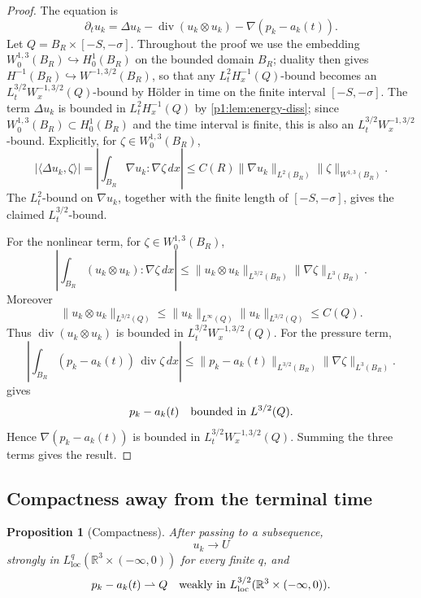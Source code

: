 \documentclass[11pt]{amsart}
\theoremstyle{plain}
\newtheorem{proposition}[proposition]{Proposition}
\theoremstyle{definition}
\theoremstyle{remark}
\numberwithin{equation}{section}
\newcommand{\R}{\mathbb R}
\newcommand{\loc}{\mathrm{loc}}
\newcommand{\divergence}{\operatorname{div}}
\begin{document}
\begin{proof}
The equation is
\[
   \partial_tu_k
   =
   \Delta u_k-\divergence(u_k\otimes u_k)-\nabla(p_k-a_k(t)).
\]
Let \(Q=B_R\times[-S,-\sigma]\).  Throughout the proof we use the
embedding \(W^{1,3}_0(B_R)\hookrightarrow H^1_0(B_R)\) on the bounded
domain \(B_R\); duality then gives
\(H^{-1}(B_R)\hookrightarrow W^{-1,3/2}(B_R)\), so that any
\(L^2_tH^{-1}_x(Q)\)-bound becomes an \(L^{3/2}_tW^{-1,3/2}_x(Q)\)-bound
by H\"older in time on the finite interval \([-S,-\sigma]\).  The term
\(\Delta u_k\) is bounded in
\(L^2_tH^{-1}_x(Q)\) by \cref{p1:lem:energy-diss}; since
\(W^{1,3}_0(B_R)\subset H^1_0(B_R)\) and the time interval is finite, this is
also an \(L^{3/2}_tW^{-1,3/2}_x\)-bound.  Explicitly, for
\(\zeta\in W^{1,3}_0(B_R)\),
\[
   |\langle\Delta u_k,\zeta\rangle|
   =
   \left|\int_{B_R}\nabla u_k:\nabla\zeta\,dx\right|
   \le
   C(R)\|\nabla u_k\|_{L^2(B_R)}\|\zeta\|_{W^{1,3}(B_R)}.
\]
The \(L^2_t\)-bound on \(\nabla u_k\), together with the finite length of
\([-S,-\sigma]\), gives the claimed \(L^{3/2}_t\)-bound.

For the nonlinear term, for
\(\zeta\in W^{1,3}_0(B_R)\),
\[
   \left|\int_{B_R}(u_k\otimes u_k):\nabla\zeta\,dx\right|
   \le
   \|u_k\otimes u_k\|_{L^{3/2}(B_R)}
   \|\nabla\zeta\|_{L^3(B_R)}.
\]
Moreover
\[
   \|u_k\otimes u_k\|_{L^{3/2}(Q)}
   \le
   \|u_k\|_{L^\infty(Q)}\|u_k\|_{L^{3/2}(Q)}
   \le C(Q).
\]
Thus \(\divergence(u_k\otimes u_k)\) is bounded in
\(L^{3/2}_tW^{-1,3/2}_x(Q)\).
For the pressure term,
\[
   \left|\int_{B_R}(p_k-a_k(t))\,\divergence\zeta\,dx\right|
   \le
   \|p_k-a_k(t)\|_{L^{3/2}(B_R)}
   \|\nabla\zeta\|_{L^3(B_R)}.
\]
 gives
\[
   p_k-a_k(t)\quad\hbox{bounded in }L^{3/2}(Q).
\]
Hence \(\nabla(p_k-a_k(t))\) is bounded in
\(L^{3/2}_tW^{-1,3/2}_x(Q)\).  Summing the three terms gives the result.
\end{proof}

\subsection{Compactness away from the terminal time}

\begin{proposition}[Compactness]\label{p1:prop:compactness}
After passing to a subsequence,
\[
   u_k\to U
\]
strongly in \(L^q_{\loc}(\R^3\times(-\infty,0))\) for every finite \(q\), and
\[
   p_k-a_k(t)\rightharpoonup Q
   \quad\hbox{weakly in }L^{3/2}_{\loc}(\R^3\times(-\infty,0)).
\]
\end{proposition}
\end{document}
